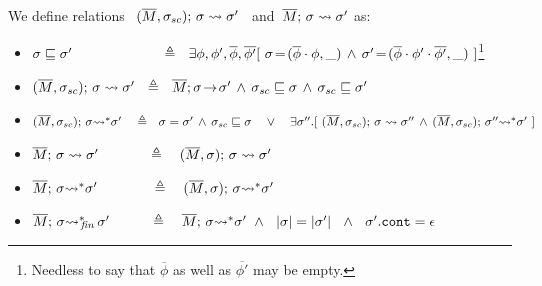  
\begin{definition}
\label{def:shallow:term}
We define relations \    $(\overline{M}, \sigma_{sc});\, {\sigma} \rightsquigarrow \sigma'$ \ and\  $\overline{M};\, {\sigma} \rightsquigarrow \sigma'$ as:

\begin{itemize}
\item
 $\EarlierS {\sigma}  {\sigma'} \ \ \ \ \ \  \ \ \ \ \ \ \ \ \ \  \ \ \  \triangleq \ \ %
 {\exists  \phi, \phi',\overline \phi, \overline {\phi'} [\  \sigma\!=\!({\overline \phi\cdot \phi},\_)\, \wedge\, \sigma'\!=\!(\overline \phi\cdot \phi'\cdot \overline {\phi'},\_)\ ] } $\footnote{Needless to say that   $\overline \phi$ as well as ${\overline {\phi'}}$ may be empty.}
\item
{ $(\overline{M}, \sigma_{sc});\, {\sigma} \rightsquigarrow \sigma'  \  \   \triangleq \ \    \overline{M};\sigma\! \rightarrow\! {\sigma'} \, \wedge\, 
  {\sigma_{sc}} \sqsubseteq {\sigma} \, \wedge\,   {\sigma_{sc}} \sqsubseteq {\sigma'} $}
\item
 $(\overline{M}, \sigma_{sc});\, {\sigma} {\rightsquigarrow^*} \sigma' \ \ \ \triangleq \ \  \sigma=\sigma' \, \wedge\,   {\sigma_{sc}} \sqsubseteq {\sigma}\  \ \ \vee
 \ \ \ \exists \sigma''.[\ (\overline{M}, \sigma_{sc});\, {\sigma} \rightsquigarrow \sigma'' \, \wedge\, 
(\overline{M}, \sigma_{sc});\, {\sigma''} {\rightsquigarrow^*} \sigma'\ ]$
 \item
{  $\overline{M};\, {\sigma} \rightsquigarrow \sigma' \ \  \ \ \ \ \   \,   \ \ \ \triangleq \ \ \  (\overline{M}, \sigma);\, {\sigma} \rightsquigarrow \sigma'$}
  \item
{  $\overline{M};\, {\sigma} {\rightsquigarrow^*} \sigma'   \ \ \ \ \ \ \,  \ \ \ \  \ \triangleq  \ \ \  (\overline{M}, \sigma);\, {\sigma} {\rightsquigarrow^*} \sigma'$}\ \  
\item
  $\overline{M};\, {\sigma} {\rightsquigarrow^*}\!\!_{\mathit{fin}}\, \sigma'   \ \ \ \ \  \,  \ \  \ \triangleq  \ \ \  \overline{M};\, {\sigma} {\rightsquigarrow^*} \sigma'  \ \wedge\ \
 {|\sigma| = |\sigma'| \ \ \wedge \ \ \sigma'.\mbox{\normalfont{\texttt{cont}}}=\epsilon  } $
 \end{itemize}
\end{definition}


